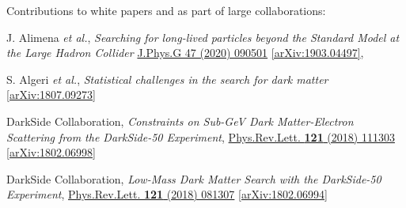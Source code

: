 \documentclass[11pt]{article}
\newenvironment{packed_enumerate}[1][]{
\begin{etaremune}[#1]
  \setlength{\itemsep}{3pt}
  \setlength{\parskip}{0pt}
  \setlength{\parsep}{0pt}}{\end{etaremune}
}
\begin{document}
\noindent
Contributions to white papers and as part of large collaborations:

\begin{packed_enumerate}[start=4]

\item J. Alimena \emph{et al.}, \emph{Searching for long-lived particles beyond the Standard Model at the Large Hadron Collider}  \href{https://iopscience.iop.org/article/10.1088/1361-6471/ab4574}{J.Phys.G 47 (2020) 090501} \href{https://arxiv.org/abs/1903.04497}{[arXiv:1903.04497]}, 

\item S. Algeri \emph{et al.}, \emph{Statistical challenges in the search for dark matter} \href{https://arxiv.org/abs/1807.09273}{[arXiv:1807.09273]}

\item DarkSide Collaboration, \emph{Constraints on Sub-GeV Dark Matter-Electron Scattering from the DarkSide-50 Experiment}, \href{https://journals.aps.org/prl/abstract/10.1103/PhysRevLett.121.111303}{Phys.Rev.Lett. \textbf{121} (2018) 111303} \href{https://arxiv.org/abs/1802.06998}{[arXiv:1802.06998]}

\item DarkSide Collaboration, \emph{Low-Mass Dark Matter Search with the DarkSide-50 Experiment}, \href{https://journals.aps.org/prl/abstract/10.1103/PhysRevLett.121.081307}{Phys.Rev.Lett. \textbf{121} (2018) 081307}  \href{https://arxiv.org/abs/1802.06994}{[arXiv:1802.06994]}


\end{packed_enumerate}

\end{document}
